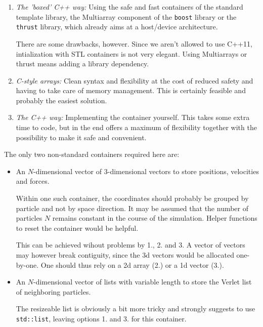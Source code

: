 \documentclass{scrartcl}
\begin{document}
\begin{enumerate}
    \item \emph{The 'boxed' C++ way:} Using the safe and fast containers
        of the standard template library, 
        the Multiarray component of the \verb|boost| library
        or the \verb|thrust| library, which already aims at a host/device
        architecture.

        There are some drawbacks, however. 
        Since we aren't allowed to use C++11, intialization with STL containers
        is not very elegant. Using Multiarrays or thrust means adding a 
        library dependency.
    \item \emph{C-style arrays:} Clean syntax and flexibility 
        at the cost of reduced safety and having to take care of 
        memory management. This is certainly feasible and probably the 
        easiest solution.
    \item \emph{The C++ way:} Implementing the container yourself.
        This takes some extra time to code, but in the end offers a maximum of
        flexibility together with the possibility to make it safe and convenient.
\end{enumerate}

The only two non-standard containers required here are:
\begin{itemize}
    \item An $N$-dimensional vector of $3$-dimensional vectors to 
        store positions, velocities and forces.

        Within one such container, the coordinates should probably be grouped
        by particle and not by space direction. 
        It may be assumed that the number of particles $N$ remains constant
        in the course of the simulation.
        Helper functions to reset the container would be helpful.

        This can be achieved wihout problems by 1., 2. and 3.
        A vector of vectors may however break contiguity,
        since the 3d vectors would be allocated one-by-one.
        One should thus rely on a 2d array (2.) or a 1d vector (3.).

    \item An $N$-dimensional vector of lists with variable length
        to store the Verlet list of neighboring particles.

        The resizeable list is obviously a bit more tricky and strongly
        suggests to use \verb|std::list|, leaving options 1. and 3. 
        for this container.
\end{itemize}
\end{document}
